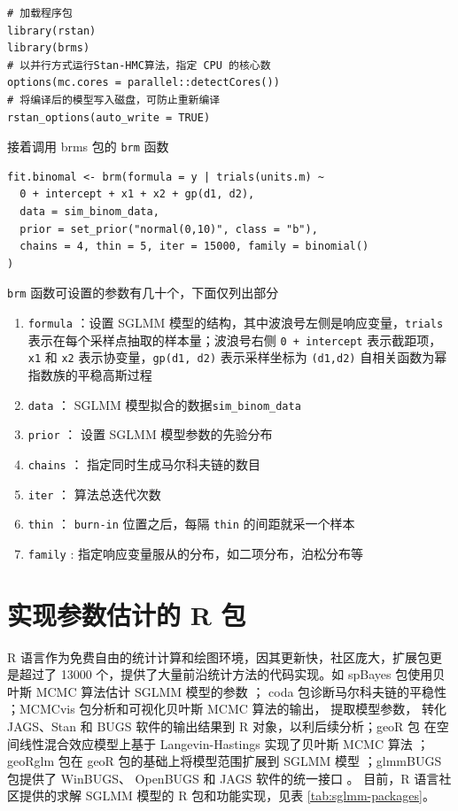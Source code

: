 \documentclass[12pt,a4paper,UTF8,twoside]{book}
\providecommand{\tightlist}{%
  \setlength{\itemsep}{0pt}\setlength{\parskip}{0pt}}
\theoremstyle{definition}
\theoremstyle{definition}
\theoremstyle{definition}
\theoremstyle{remark}
\begin{document}
\begin{verbatim}
# 加载程序包
library(rstan)
library(brms)
# 以并行方式运行Stan-HMC算法，指定 CPU 的核心数
options(mc.cores = parallel::detectCores())
# 将编译后的模型写入磁盘，可防止重新编译
rstan_options(auto_write = TRUE)
\end{verbatim}

\noindent 接着调用 brms 包的 \texttt{brm} 函数

\begin{verbatim}
fit.binomal <- brm(formula = y | trials(units.m) ~ 
  0 + intercept + x1 + x2 + gp(d1, d2), 
  data = sim_binom_data,
  prior = set_prior("normal(0,10)", class = "b"),
  chains = 4, thin = 5, iter = 15000, family = binomial()
)    
\end{verbatim}

\texttt{brm} 函数可设置的参数有几十个，下面仅列出部分

\begin{enumerate}
\def\labelenumi{\arabic{enumi}.}
\tightlist
\item
  \texttt{formula} ：设置 SGLMM 模型的结构，其中波浪号左侧是响应变量，\texttt{trials} 表示在每个采样点抽取的样本量；波浪号右侧 \texttt{0\ +\ intercept} 表示截距项， \texttt{x1} 和 \texttt{x2} 表示协变量，\texttt{gp(d1,\ d2)} 表示采样坐标为 \texttt{(d1,d2)} 自相关函数为幂指数族的平稳高斯过程
\item
  \texttt{data} ： SGLMM 模型拟合的数据\texttt{sim\_binom\_data}
\item
  \texttt{prior} ： 设置 SGLMM 模型参数的先验分布
\item
  \texttt{chains} ： 指定同时生成马尔科夫链的数目
\item
  \texttt{iter} ： 算法总迭代次数
\item
  \texttt{thin} ： \texttt{burn-in} 位置之后，每隔 \texttt{thin} 的间距就采一个样本
\item
  \texttt{family} : 指定响应变量服从的分布，如二项分布，泊松分布等
\end{enumerate}

\hypertarget{subsec:sglmm-with-r}{%
\section{实现参数估计的 R 包}\label{subsec:sglmm-with-r}}

R 语言作为免费自由的统计计算和绘图环境，因其更新快，社区庞大，扩展包更是超过了 13000 个，提供了大量前沿统计方法的代码实现。如 spBayes 包使用贝叶斯 MCMC 算法估计 SGLMM 模型的参数 \citep{spBayes2015}； coda 包诊断马尔科夫链的平稳性 \citep{coda2006}；MCMCvis 包分析和可视化贝叶斯 MCMC 算法的输出， 提取模型参数， 转化 JAGS、Stan 和 BUGS 软件的输出结果到 R 对象，以利后续分析；geoR 包 在空间线性混合效应模型上基于 Langevin-Hastings 实现了贝叶斯 MCMC 算法 \citep{geoR2001}；geoRglm 包在 geoR 包的基础上将模型范围扩展到 SGLMM 模型 \citep{geoRglm2002}；glmmBUGS 包提供了 WinBUGS、 OpenBUGS 和 JAGS 软件的统一接口 \citep{glmmBUGS2010MCMC}。 目前，R 语言社区提供的求解 SGLMM 模型的 R 包和功能实现，见表 \ref{tab:sglmm-packages}。
\end{document}
